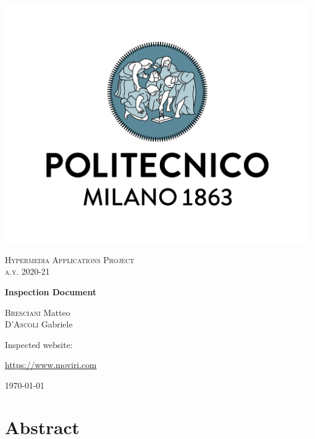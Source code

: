 \documentclass[fontsize=11pt,paper=a4,pagesize=auto]{report}
\begin{document}
\begin{titlepage}
	\centering
	\includegraphics[scale = 0.25]{images/polimi.jpg}\par
	
	{\scshape\Large
		Hypermedia Applications Project\\
		a.y. 2020-21\par}
			\vspace{0.5cm}
	{\huge\bfseries
		Inspection Document\\\par}

	\vspace{1cm}
	{\Large
		{\scshape Bresciani} Matteo\\
		{\scshape D'Ascoli}  Gabriele\par

		}
			\vspace{1cm}

		{\huge\Large
		Inspected website:}\\
					\vspace{0.5cm}

		\huge{\url{https://www.moviri.com}}
		
	
\vspace{0.5cm}
	{\large\today\par}
\end{titlepage}


\tableofcontents
\chapter{Abstract}

\end{document}
